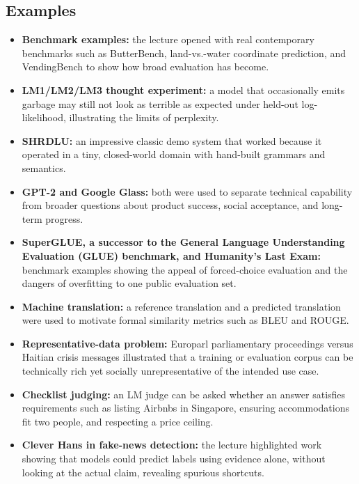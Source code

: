 \documentclass[11pt]{article}
\begin{document}
\subsection{Examples}
\begin{itemize}
    \item \textbf{Benchmark examples:} the lecture opened with real contemporary benchmarks such as ButterBench, land-vs.-water coordinate prediction, and VendingBench to show how broad evaluation has become.
    \item \textbf{LM1/LM2/LM3 thought experiment:} a model that occasionally emits garbage may still not look as terrible as expected under held-out log-likelihood, illustrating the limits of perplexity.
    \item \textbf{SHRDLU:} an impressive classic demo system that worked because it operated in a tiny, closed-world domain with hand-built grammars and semantics.
    \item \textbf{GPT-2 and Google Glass:} both were used to separate technical capability from broader questions about product success, social acceptance, and long-term progress.
    \item \textbf{SuperGLUE, a successor to the General Language Understanding Evaluation (GLUE) benchmark, and Humanity's Last Exam:} benchmark examples showing the appeal of forced-choice evaluation and the dangers of overfitting to one public evaluation set.
    \item \textbf{Machine translation:} a reference translation and a predicted translation were used to motivate formal similarity metrics such as BLEU and ROUGE.
    \item \textbf{Representative-data problem:} Europarl parliamentary proceedings versus Haitian crisis messages illustrated that a training or evaluation corpus can be technically rich yet socially unrepresentative of the intended use case.
    \item \textbf{Checklist judging:} an LM judge can be asked whether an answer satisfies requirements such as listing Airbnbs in Singapore, ensuring accommodations fit two people, and respecting a price ceiling.
    \item \textbf{Clever Hans in fake-news detection:} the lecture highlighted work showing that models could predict labels using evidence alone, without looking at the actual claim, revealing spurious shortcuts.
\end{itemize}
\end{document}
